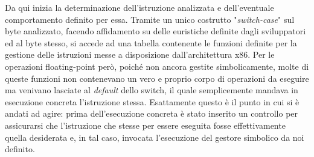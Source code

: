 \documentclass[Lau, oneside]{sapthesis}%
\begin{document}
\newline \newline
Da qui inizia la determinazione dell'istruzione analizzata e dell'eventuale comportamento definito per essa.
\newline \newline
Tramite un unico costrutto "\textit{switch-case}" sul byte analizzato, facendo affidamento su delle euristiche definite dagli sviluppatori ed al byte stesso, si accede ad una tabella contenente le funzioni definite per la gestione delle istruzioni messe a disposizione dall'architettura x86.
\newline \newline
Per le operazioni floating-point però, poiché non ancora gestite simbolicamente, molte di queste funzioni non contenevano un vero e proprio corpo di operazioni da eseguire ma venivano lasciate al \textit{default} dello switch, il quale semplicemente mandava in esecuzione concreta l'istruzione stessa.
\newline
Esattamente questo è il punto in cui si è andati ad agire: prima dell'esecuzione concreta è stato inserito un controllo per assicurarsi che l'istruzione che stesse per essere eseguita fosse effettivamente quella desiderata e, in tal caso, invocata l'esecuzione del gestore simbolico da noi definito.
\end{document}
